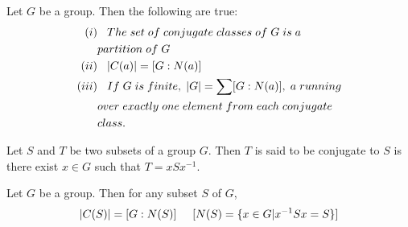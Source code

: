 \begin{teo}
    Let $G$ be a group. Then the following are true:
    \begin{align*}
        (i)&\hspace{.3cm}The\hspace{.1cm}set\hspace{.1cm}of\hspace{.1cm}conjugate\hspace{.1cm}classes\hspace{.1cm}of\hspace{.1cm}G\hspace{.1cm}is\hspace{.1cm}a\hspace{.1cm}\\ &partition\hspace{.1cm}of\hspace{.1cm}G\\
        (ii)&\hspace{.3cm}|C(a)|=[G:N(a)]\\
        (iii)&\hspace{.3cm}If\hspace{.1cm}G\hspace{.1cm}is\hspace{.1cm}finite,\hspace{.1cm}|G|=\sum[G:N(a)],\hspace{.1cm}a\hspace{.1cm} running \\
        &over\hspace{.1cm} exactly\hspace{.1cm} one\hspace{.1cm} element\hspace{.1cm} from\hspace{.1cm} each\hspace{.1cm} conjugate\hspace{.1cm} \\
        &class.
    \end{align*}
\end{teo}
\begin{defi}
    Let $S$ and $T$ be two subsets of a group $G$. Then $T$ is said to be conjugate to $S$ is there exist $x\in G$ such that $T=xSx^{-1}$.
\end{defi}
\begin{teo}
    Let $G$ be a group. Then for any subset $S$ of $G$,
    \begin{equation*}
        |C(S)|=[G:N(S)]\hspace{.5cm}[N(S)=\{x\in G|x^{-1}Sx=S\}]
    \end{equation*}
\end{teo}
